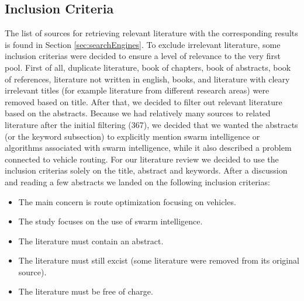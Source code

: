 



\subsection{Inclusion Criteria}
\label{sec:inclusionCriteria}
The list of sources for retrieving relevant literature with the corresponding results is found in Section \vref{sec:searchEngines}. To exclude irrelevant literature, some inclusion criterias were decided to ensure a level of relevance to the very first pool. First of all, duplicate literature, book of chapters, book of abstracts, book of references, literature not written in english, books, and literature with cleary irrelevant titles (for example literature from different research areas) were removed based on title. After that, we decided to filter out relevant literature based on the abstracts. Because we had relatively many sources to related literature after the initial filtering (367), we decided that we wanted the abstracts (or the keyword subsection) to explicitly mention swarm intelligence or algorithms associated with swarm intelligence, while it also described a problem connected to vehicle routing. For our literature review we decided to use the inclusion criterias solely on the title, abstract and keywords. After a discussion and reading a few abstracts we landed on the following inclusion criterias:
\begin{itemize}
\item The main concern is route optimization focusing on vehicles. 
\item The study focuses on the use of swarm intelligence.
\item The literature must contain an abstract. 
\item The literature must still excist (some literature were removed from its original source).
\item The literature must be free of charge.
\end{itemize}

